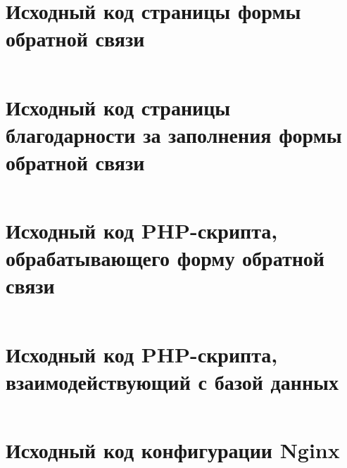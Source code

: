 \documentclass[a4paper, 14pt]{extarticle}
\newenvironment{code}{\captionsetup{type=listing}}{}
\begin{document}
\section{Исходный код страницы формы обратной связи}
\label{app:index.html}

\begin{code}
  \inputminted{html}{../task-2/index.html}
\end{code}

\newpage

\section{Исходный код страницы благодарности за заполнения формы обратной связи}
\label{app:feedback-success.html}

\begin{code}
  \inputminted{html}{../task-2/feedback-success.html}
\end{code}

\newpage

\section{Исходный код PHP-скрипта, обрабатывающего форму обратной связи}
\label{app:feedback.php}

\begin{code}
  \inputminted{php}{../task-2/feedback.php}
\end{code}

\newpage

\section{Исходный код PHP-скрипта, взаимодействующий с базой данных}
\label{app:database.php}

\begin{code}
  \inputminted{php}{../task-2/database.php}
\end{code}

\newpage

\section{Исходный код конфигурации Nginx}
\label{app:nginx.conf}

\begin{code}
  \inputminted{text}{../task-3/nginx.conf}
\end{code}
\end{document}
